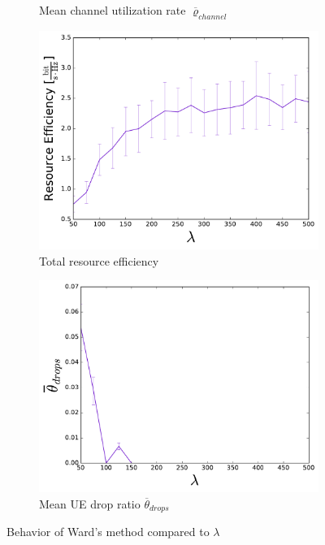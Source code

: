 \begin{figure}[H]
\begin{subfigure}[b]{0.5\linewidth}
    \caption{Mean channel utilization rate $\overline{\varrho}_{channel}$} 
    \label{fig:WARD_8} 
    \vspace{4ex}
  \end{subfigure} 
  \begin{subfigure}[b]{0.5\linewidth}
    \centering
    \captionsetup{justification=centering}
    \includegraphics[width=1\linewidth]{figures/WARD_9} 
    \caption{Total resource efficiency} 
    \label{fig:WARD_9} 
  \end{subfigure}%
  \begin{subfigure}[b]{0.5\linewidth}
    \centering
    \captionsetup{justification=centering}
    \includegraphics[width=1\linewidth]{figures/WARD_10} 
    \caption{Mean UE drop ratio $\overline{\theta}_{drops}$} 
    \label{fig:WARD_10} 
  \end{subfigure} 
  \caption{Behavior of Ward's method compared to $\lambda$}
  \label{fig:pretty_results_WARD} 
\end{figure}

